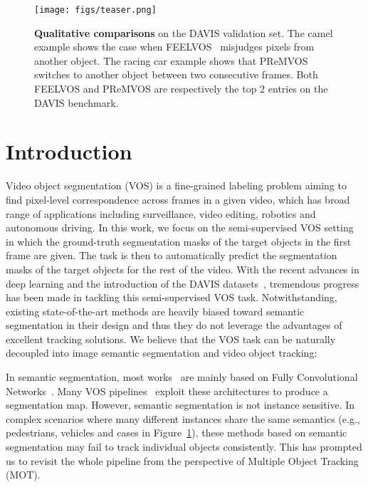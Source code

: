 \documentclass[10pt,twocolumn,letterpaper]{article}
\begin{document}
\begin{figure}[t]
\begin{center}
   \texttt{[image: figs/teaser.png]}
\end{center}
\caption{\textbf{Qualitative comparisons} on the DAVIS validation set. The camel example shows the case when FEELVOS~\cite{voigtlaender2019feelvos} misjudges pixels from another object.
   The racing car example shows that PReMVOS~\cite{luiten2018premvos} switches to another object between two consecutive frames.
   Both FEELVOS and PReMVOS are respectively the top 2 entries on the DAVIS benchmark.
}
   \vspace*{-15pt}
\label{fig:teaser}
\end{figure}



\vspace{-15pt}
\section{Introduction}

Video object segmentation (VOS) is a fine-grained labeling problem aiming to find pixel-level correspondence across frames in a given video, which has broad range of applications including surveillance, video editing, robotics and autonomous driving.
In this work, we focus on the semi-supervised VOS setting in which the ground-truth segmentation masks of the target objects in the first frame are given. The task is then to automatically predict the segmentation masks of the target objects for the rest of the video.
With the recent advances in deep learning and the introduction of the DAVIS datasets~\cite{perazzi2016davis, pont2017davis}, tremendous progress has been made in tackling this semi-supervised VOS task.
Notwithstanding, existing state-of-the-art methods are heavily biased toward semantic segmentation in their design and thus they do not leverage the advantages of excellent tracking solutions. We believe that the VOS task can be naturally decoupled into image semantic segmentation and video object tracking:

In semantic segmentation, most works~\cite{chen2014deeplabv1, chen2017deeplabv2, chen2017deeplabv3, chen2018deeplabv3plus} are mainly based on Fully Convolutional Networks~\cite{long2015fcn}.
Many VOS pipelines~\cite{khoreva2017lucid, caelles2017osvos, voigtlaender2017online, bao2018cnn, voigtlaender2019feelvos, wang2019ranet, oh2018fast} exploit these architectures to produce  a segmentation map.
However, semantic segmentation is not instance sensitive. In complex scenarios where many different instances share the same semantics (e.g., pedestrians, vehicles and cases in Figure~\ref{fig:teaser}), these methods based on semantic segmentation may fail to track individual objects consistently.
This has prompted us to revisit the whole pipeline from the perspective of Multiple Object Tracking (MOT).
\end{document}

